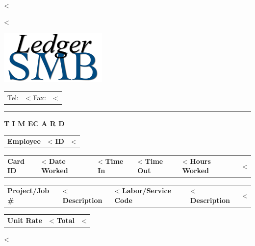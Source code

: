 \documentclass{scrartcl}
\begin{document}
\pagestyle{myheadings}
\thispagestyle{empty}

\fontsize{10pt}{12pt}\selectfont

\vspace*{-1.3cm}

\parbox{\textwidth}{%
  \parbox[b]{.42\textwidth}{%
    <%
   
    <%
  }
  \parbox[b]{.2\textwidth}{
    \includegraphics[scale=0.3]{ledger-smb}
  }\hfill
  \begin{tabular}[b]{rr@{}}
  Tel: & <%
  Fax: & <%
  \end{tabular}

  \rule[1.5em]{\textwidth}{0.5pt}
}

\centerline{\textbf{T I M E}\hspace{0.5cm}\textbf{C A R D}}

\vspace*{0.5cm}

\begin{tabular}[t]{ll}
  \textbf{Employee} & <%
  \textbf{ID} & <%
\end{tabular}
\hfill
\begin{tabular}[t]{ll}
  \textbf{Card ID} & <%
  \textbf{Date Worked} & <%
  \textbf{Time In} & <%
  \textbf{Time Out} & <%
  \textbf{Hours Worked} & <%
\end{tabular}

\vspace{1cm}

\begin{tabular}[b]{ll}
  \textbf{Project/Job \#} & <%
  \textbf{Description} & <%
  \textbf{Labor/Service Code} & <%
  \textbf{Description} & <%
\end{tabular}
\hfill
\begin{tabular}[b]{lr}
  \textbf{Unit Rate} & <%
  \textbf{Total} & <%
\end{tabular}
  
\vspace{0.3cm}

<%
 
\end{document}
